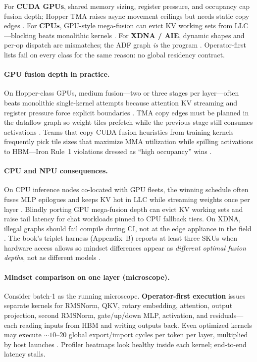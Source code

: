 For \textbf{CUDA GPUs}, shared memory sizing, register pressure, and occupancy cap fusion depth; Hopper TMA raises async movement ceilings but needs static copy edges \citep{nvidia2022hopper,semianalysis2024tma}.
For \textbf{CPUs}, GPU-style mega-fusion can evict KV working sets from LLC---blocking beats monolithic kernels \citep{patel2025llminference}.
For \textbf{XDNA / AIE}, dynamic shapes and per-op dispatch are mismatches; the ADF graph \emph{is} the program \citep{amd2024xdna}.
Operator-first lists fail on every class for the same reason: no global residency contract.

\paragraph{GPU fusion depth in practice.}
On Hopper-class GPUs, medium fusion---two or three stages per layer---often beats monolithic single-kernel attempts because attention KV streaming and register pressure force explicit boundaries \citep{dao2022flashattention,nvidia2022hopper}.
TMA copy edges must be planned in the dataflow graph so weight tiles prefetch while the previous stage still consumes activations \citep{semianalysis2024tma}.
Teams that copy CUDA fusion heuristics from training kernels frequently pick tile sizes that maximize MMA utilization while spilling activations to HBM---Iron Rule~1 violations dressed as ``high occupancy'' wins \citep{memoryfloor2026}.

\paragraph{CPU and NPU consequences.}
On CPU inference nodes co-located with GPU fleets, the winning schedule often fuses MLP epilogues and keeps KV hot in LLC while streaming weights once per layer \citep{patel2025llminference}.
Blindly porting GPU mega-fusion depth can evict KV working sets and raise tail latency for chat workloads pinned to CPU fallback tiers.
On XDNA, illegal graphs should fail compile during CI, not at the edge appliance in the field \citep{amd2024xdna,amd2024aie}.
The book's triplet harness (Appendix~B) reports at least three SKUs when hardware access allows so mindset differences appear as \emph{different optimal fusion depths}, not as different models \citep{yirage2026}.

\paragraph{Mindset comparison on one layer (microscope).}
Consider batch-1 as the running microscope.
\textbf{Operator-first execution} issues separate kernels for RMSNorm, QKV, rotary embedding, attention, output projection, second RMSNorm, gate/up/down MLP, activation, and residuals---each reading inputs from HBM and writing outputs back.
Even optimized kernels may execute ${\sim}10$--$20$ global export/import cycles per token per layer, multiplied by host launches \citep{taxbreak2026}.
Profiler heatmaps look healthy inside each kernel; end-to-end latency stalls.

